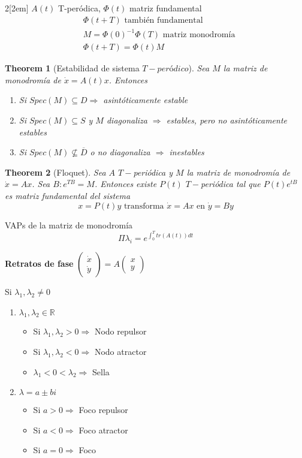 \documentclass[leqno]{article}
\newtheorem*{theorem}{Theorem}
\begin{document}
\begin{multicols}{2}[\columnsep2em]
$A(t)$ T-peródica, $\Phi (t)$ matriz fundamental
\begin{align*}
  & \Phi (t + T) \text{ también fundamental} \\
  & M = \Phi (0)^{-1}\Phi (T) \text{ matriz monodromía}\\
  & \Phi (t+T)=\Phi (t)M
\end{align*}

\begin{theorem}[Estabilidad de sistema $T-peródico$] Sea $M$ la matriz de monodromía de  $\dot{x} = A(t)x$. Entonces
  \begin{enumerate}[topsep=-6pt, itemsep=0pt]
    \item Si $Spec(M)\subseteq D \Rightarrow $ asintóticamente estable
	\item Si  $Spec(M)\subseteq S$ y $M$ diagonaliza  $\Rightarrow$ estables, pero no asintóticamente estables
	\item Si $Spec(M)\not\subseteq \overline{D} $ o no diagonaliza $\Rightarrow$ inestables
  \end{enumerate}
\end{theorem}

\begin{theorem}[Floquet]
Sea $A$  $T-$periódica y  $M$ la matriz de monodromía de  $\dot{x}=Ax$. Sea $B : e^{TB}=M$. Entonces existe $P(t)$  $T-$periódica tal que  $P(t)e^{tB}$ es matriz fundamental del sistema
\[
x = P(t)y \text{ transforma } \dot{x}=Ax \text{ en } \dot{y} = By
\] 
\end{theorem}

VAPs de la matriz de monodromía
\[
\Pi \lambda_i = e^{\int_0^T tr(A(t))dt}
\] 

\textbf{Retratos de fase} $\displaystyle \begin{pmatrix} \dot{x}\\\dot{y} \end{pmatrix} = A \begin{pmatrix} x\\y \end{pmatrix}  $

Si $\lambda_1, \lambda_2 \neq 0$
\begin{enumerate}[topsep=-6pt, itemsep=0pt]
  \item $\lambda_1, \lambda_2 \in \mathbb{R}$
	\begin{itemize}[topsep=-6pt, itemsep=0pt]
	  \item Si $\lambda_1, \lambda_2>0 \Rightarrow $ Nodo repulsor
	  \item Si $\lambda_1, \lambda_2<0 \Rightarrow $ Nodo atractor
	  \item $\lambda_1<0<\lambda_2 \Rightarrow $ Sella
	\end{itemize}
  \item $\lambda = a\pm bi$
	\begin{itemize}[topsep=-6pt, itemsep=0pt]
	  \item Si $a>0 \Rightarrow$ Foco repulsor 
	  \item Si $a<0 \Rightarrow$ Foco atractor
	  \item Si $a=0 \Rightarrow$ Foco
	\end{itemize}
\end{enumerate}


\end{multicols}
\end{document}
